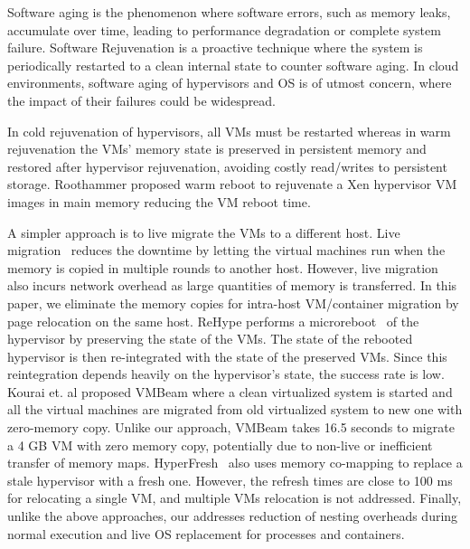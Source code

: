 %

Software aging \cite{parnas1994software} is the phenomenon where
software errors, such as  memory leaks, accumulate over time,
leading to performance degradation or complete system failure.
Software Rejuvenation \cite{huang1995software} is a proactive technique where 
the system is periodically restarted to a clean internal state to
counter software aging. In cloud environments, software aging 
of hypervisors and OS is of utmost concern, where the impact of 
their failures could be widespread.

In cold rejuvenation of hypervisors, all VMs must be restarted
whereas in warm rejuvenation the VMs' memory state is preserved 
in persistent memory and restored after hypervisor rejuvenation, 
avoiding costly read/writes to persistent storage. 
Roothammer \cite{kourai2007fast} proposed warm reboot to rejuvenate 
a Xen hypervisor 
VM images in main memory reducing the VM reboot time. 

A simpler approach is to live migrate the VMs to a different host. 
Live migration~\cite{clark2005live, postcopy} reduces the downtime 
by letting the virtual machines run when the memory is copied in 
multiple rounds to another host. However, live migration also incurs 
network overhead as large quantities of memory is transferred. 
In this paper, we eliminate the memory copies for intra-host VM/container 
migration by page relocation on the same host. 
ReHype \cite{le2011rehype} performs a microreboot~\cite{candea2004microreboot} of 
the hypervisor by preserving the state of the VMs. The state of 
the rebooted hypervisor is then re-integrated with the state of the preserved VMs. 
Since this reintegration depends heavily on the hypervisor's state,
the success rate is low.   
Kourai et. al proposed VMBeam \cite{kourai2015zero}
where a clean virtualized system is started and all the 
virtual machines are migrated from old virtualized system to new one 
with zero-memory copy. Unlike our approach, VMBeam takes 16.5 seconds 
to migrate a 4 GB VM with zero memory copy, potentially due to 
non-live or inefficient transfer of memory maps. 
HyperFresh~\cite{hyperfresh_apsys} also uses memory co-mapping  to
replace a stale hypervisor with a fresh one. However, the refresh times 
are close to 100 ms for relocating a single VM, and multiple VMs relocation
is not addressed. Finally, unlike the above approaches, our \arch
addresses reduction of nesting overheads during normal execution
and live OS replacement for processes and containers.

